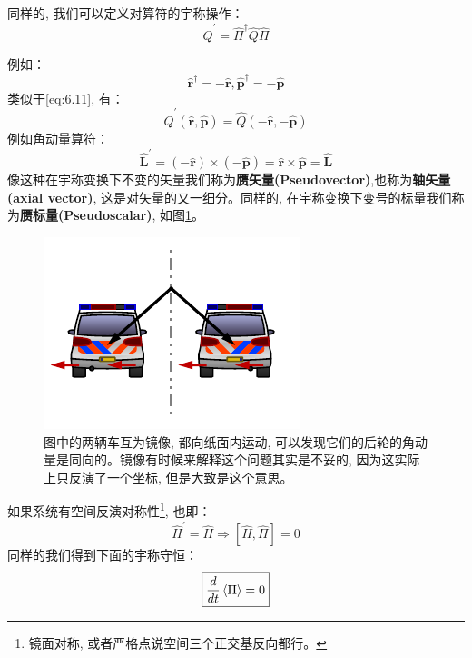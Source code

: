 同样的, 我们可以定义对算符的宇称操作：
\begin{equation}
    \hat{Q}^\prime=\hat{\Pi}^\dagger\hat{Q}\hat{\Pi}
\end{equation}
\begin{thinknote}
    例如：
    \[\hat{\mathbf{r}}^\dagger=-\hat{\mathbf{r}},\hat{\mathbf{p}}^\dagger=-\hat{\mathbf{p}}\]
    类似于\ref{eq:6.11}, 有：
    \begin{equation}
        \hat{Q}^\prime(\hat{\mathbf{r}},\hat{\mathbf{p}})=\hat{Q}(-\hat{\mathbf{r}},-\hat{\mathbf{p}})
    \end{equation}
    例如角动量算符：
    \begin{equation}
        \hat{\mathbf{L}}^\prime=(-\hat{\mathbf{r}})\times(-\hat{\mathbf{p}})=\hat{\mathbf{r}}\times\hat{\mathbf{p}}=\hat{\mathbf{L}}
    \end{equation}
    像这种在宇称变换下不变的矢量我们称为\textbf{赝矢量(Pseudovector)},也称为\textbf{轴矢量(axial vector)}, 这是对矢量的又一细分。同样的, 在宇称变换下变号的标量我们称为\textbf{赝标量(Pseudoscalar)}, 如图\ref{fig:6.3}。
\end{thinknote}
\begin{figure}[htbp]
    \centering
    \includegraphics[scale=2]{fig/6.3.pdf}
    \caption{图中的两辆车互为镜像, 都向纸面内运动, 可以发现它们的后轮的角动量是同向的。镜像有时候来解释这个问题其实是不妥的, 因为这实际上只反演了一个坐标, 但是大致是这个意思。}
    \label{fig:6.3}
\end{figure}

如果系统有空间反演对称性\footnote{镜面对称, 或者严格点说空间三个正交基反向都行。}, 也即：
\begin{equation}
    \label{eq:6.26}
    \hat{H}^\prime=\hat{H}\Rightarrow\boxed{\left[\hat{H},\hat{\Pi}\right]=0}
\end{equation}
同样的我们得到下面的宇称守恒：
\begin{equation}
    \boxed{\frac{d}{dt}\braket{\Pi}=0}
\end{equation}

